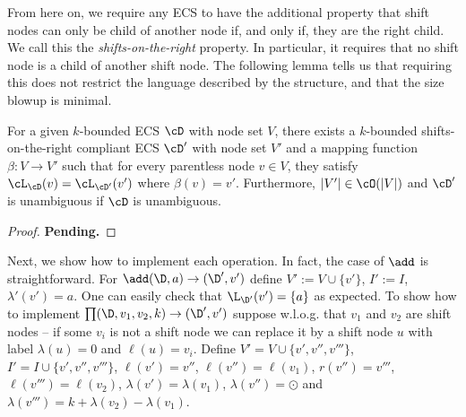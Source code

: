 From here on, we require any ECS to have the additional property that shift nodes can only be child of another node if, and only if, they are the right child. We call this the {\em shifts-on-the-right} property. In particular, it requires that no shift node is a child of another shift node. The following lemma tells us that requiring this does not restrict the language described by the structure, and that the size blowup is minimal.

\begin{lemma}
	For a given $k$-bounded ECS $\cD$ with node set $V$, there exists a $k$-bounded shifts-on-the-right compliant ECS $\cD'$ with node set $V'$ and a mapping function $\beta:V\to V'$ such that for every parentless node $v\in V$, they satisfy $\cL_{\cD}(v) = \cL_{\cD'}(v')$ where $\beta(v) = v'$. Furthermore, $|V'| \in \cO(|V|)$ and $\cD'$ is unambiguous if $\cD$ is unambiguous.
\end{lemma}
\begin{proof}[Proof]
	{\bf Pending.}
\end{proof}

Next, we show how to implement each operation. In fact, the case of $\add$ is straightforward. 
For $\add(\D,a)\to(\D',v')$ define $V' := V \cup \{v'\}$, $I' := I$, $\lambda'(v') = a$. 
One can easily check that $\L_{\D'}(v') = \{a\}$ as expected. 
To show how to implement $\prod(\D,v_1, v_2, k)\to(\D',v') $ suppose w.l.o.g. that $v_1$ and $v_2$ are shift nodes -- if some $v_i$ is not a shift node we can replace it by a shift node $u$ with label $\lambda(u) = 0$ and $\ell(u) = v_i$. Define $V' = V\cup \{v',v'',v'''\}$, $I' = I\cup\{v',v'',v'''\}$, $\ell(v') = v''$, $\ell(v'') = \ell(v_1)$, $r(v'') = v'''$, $\ell(v''') = \ell(v_2)$, $\lambda(v') = \lambda(v_1)$, $\lambda(v'') = \odot$ and $\lambda(v''') = k+\lambda(v_2) - \lambda(v_1)$.

